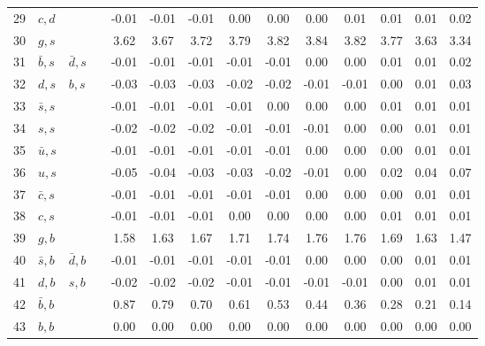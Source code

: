 \begin{tabularx}{\textwidth}{rXXX@{}S@{}S@{}S@{}S@{}S@{}S@{}S@{}S@{}S@{}S}
 29 & $c, d$           &                   &                  & -0.01 & -0.01 & -0.01 &  0.00 &  0.00 &  0.00 &  0.01 &  0.01 &  0.01 &  0.02 \\
 30 & $g, s$           &                   &                  &  3.62 &  3.67 &  3.72 &  3.79 &  3.82 &  3.84 &  3.82 &  3.77 &  3.63 &  3.34 \\
 31 & $\bar b, s$      & $\bar d, s$       &                  & -0.01 & -0.01 & -0.01 & -0.01 & -0.01 &  0.00 &  0.00 &  0.01 &  0.01 &  0.02 \\
 32 & $d, s$           & $b, s$            &                  & -0.03 & -0.03 & -0.03 & -0.02 & -0.02 & -0.01 & -0.01 &  0.00 &  0.01 &  0.03 \\
 33 & $\bar s, s$      &                   &                  & -0.01 & -0.01 & -0.01 & -0.01 &  0.00 &  0.00 &  0.00 &  0.01 &  0.01 &  0.01 \\
 34 & $s, s$           &                   &                  & -0.02 & -0.02 & -0.02 & -0.01 & -0.01 & -0.01 &  0.00 &  0.00 &  0.01 &  0.01 \\
 35 & $\bar u, s$      &                   &                  & -0.01 & -0.01 & -0.01 & -0.01 & -0.01 &  0.00 &  0.00 &  0.00 &  0.01 &  0.01 \\
 36 & $u, s$           &                   &                  & -0.05 & -0.04 & -0.03 & -0.03 & -0.02 & -0.01 &  0.00 &  0.02 &  0.04 &  0.07 \\
 37 & $\bar c, s$      &                   &                  & -0.01 & -0.01 & -0.01 & -0.01 & -0.01 &  0.00 &  0.00 &  0.00 &  0.01 &  0.01 \\
 38 & $c, s$           &                   &                  & -0.01 & -0.01 & -0.01 &  0.00 &  0.00 &  0.00 &  0.00 &  0.01 &  0.01 &  0.01 \\
 39 & $g,  b$          &                   &                  &  1.58 &  1.63 &  1.67 &  1.71 &  1.74 &  1.76 &  1.76 &  1.69 &  1.63 &  1.47 \\
 40 & $\bar s, b$      & $\bar d, b$       &                  & -0.01 & -0.01 & -0.01 & -0.01 & -0.01 &  0.00 &  0.00 &  0.00 &  0.01 &  0.01 \\
 41 & $d, b$           & $s, b$            &                  & -0.02 & -0.02 & -0.02 & -0.01 & -0.01 & -0.01 & -0.01 &  0.00 &  0.01 &  0.01 \\
 42 & $\bar b, b$      &                   &                  &  0.87 &  0.79 &  0.70 &  0.61 &  0.53 &  0.44 &  0.36 &  0.28 &  0.21 &  0.14 \\
 43 & $b, b$           &                   &                  &  0.00 &  0.00 &  0.00 &  0.00 &  0.00 &  0.00 &  0.00 &  0.00 &  0.00 &  0.00 \\

\end{tabularx}
